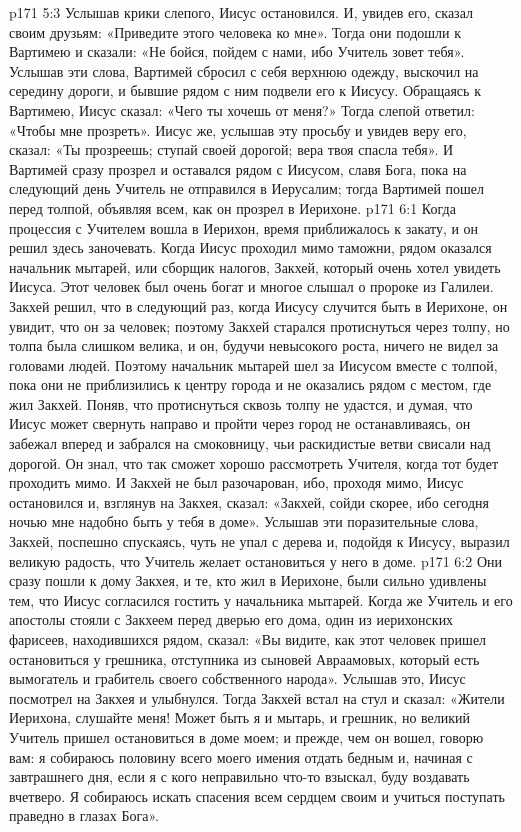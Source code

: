 \vs p171 5:3 Услышав крики слепого, Иисус остановился. И, увидев его, сказал своим друзьям: «Приведите этого человека ко мне». Тогда они подошли к Вартимею и сказали: «Не бойся, пойдем с нами, ибо Учитель зовет тебя». Услышав эти слова, Вартимей сбросил с себя верхнюю одежду, выскочил на середину дороги, и бывшие рядом с ним подвели его к Иисусу. Обращаясь к Вартимею, Иисус сказал: «Чего ты хочешь от меня?» Тогда слепой ответил: «Чтобы мне прозреть». Иисус же, услышав эту просьбу и увидев веру его, сказал: «Ты прозреешь; ступай своей дорогой; вера твоя спасла тебя». И Вартимей сразу прозрел и оставался рядом с Иисусом, славя Бога, пока на следующий день Учитель не отправился в Иерусалим; тогда Вартимей пошел перед толпой, объявляя всем, как он прозрел в Иерихоне.
\vs p171 6:1 Когда процессия с Учителем вошла в Иерихон, время приближалось к закату, и он решил здесь заночевать. Когда Иисус проходил мимо таможни, рядом оказался начальник мытарей, или сборщик налогов, Закхей, который очень хотел увидеть Иисуса. Этот человек был очень богат и многое слышал о пророке из Галилеи. Закхей решил, что в следующий раз, когда Иисусу случится быть в Иерихоне, он увидит, что он за человек; поэтому Закхей старался протиснуться через толпу, но толпа была слишком велика, и он, будучи невысокого роста, ничего не видел за головами людей. Поэтому начальник мытарей шел за Иисусом вместе с толпой, пока они не приблизились к центру города и не оказались рядом с местом, где жил Закхей. Поняв, что протиснуться сквозь толпу не удастся, и думая, что Иисус может свернуть направо и пройти через город не останавливаясь, он забежал вперед и забрался на смоковницу, чьи раскидистые ветви свисали над дорогой. Он знал, что так сможет хорошо рассмотреть Учителя, когда тот будет проходить мимо. И Закхей не был разочарован, ибо, проходя мимо, Иисус остановился и, взглянув на Закхея, сказал: «Закхей, сойди скорее, ибо сегодня ночью мне надобно быть у тебя в доме». Услышав эти поразительные слова, Закхей, поспешно спускаясь, чуть не упал с дерева и, подойдя к Иисусу, выразил великую радость, что Учитель желает остановиться у него в доме.
\vs p171 6:2 Они сразу пошли к дому Закхея, и те, кто жил в Иерихоне, были сильно удивлены тем, что Иисус согласился гостить у начальника мытарей. Когда же Учитель и его апостолы стояли с Закхеем перед дверью его дома, один из иерихонских фарисеев, находившихся рядом, сказал: «Вы видите, как этот человек пришел остановиться у грешника, отступника из сыновей Авраамовых, который есть вымогатель и грабитель своего собственного народа». Услышав это, Иисус посмотрел на Закхея и улыбнулся. Тогда Закхей встал на стул и сказал: «Жители Иерихона, слушайте меня! Может быть я и мытарь, и грешник, но великий Учитель пришел остановиться в доме моем; и прежде, чем он вошел, говорю вам: я собираюсь половину всего моего имения отдать бедным и, начиная с завтрашнего дня, если я с кого неправильно что\hyp{}то взыскал, буду воздавать вчетверо. Я собираюсь искать спасения всем сердцем своим и учиться поступать праведно в глазах Бога».
